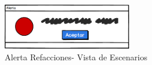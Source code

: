 \begin{figure}[!h]
	\centering
	\includegraphics[width=0.5\textwidth]{./diseno/vescenarios/imagenes/alerta}
	\caption{Alerta Refacciones- Vista de Escenarios}
	\label{fig:Alerta Refacciones - Vista de Escenarios}
\end{figure}
\clearpage